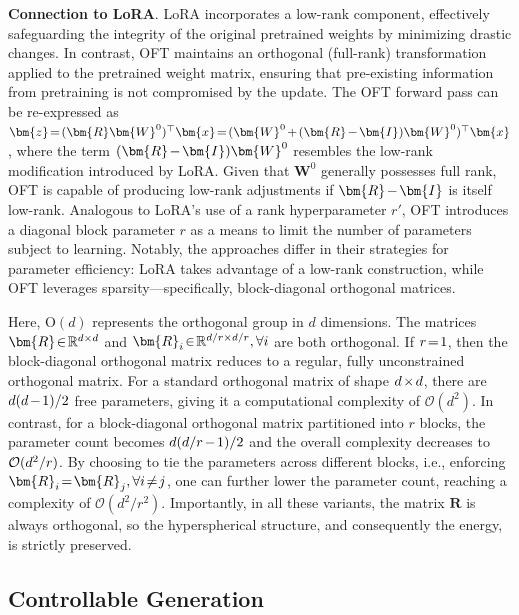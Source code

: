 \textbf{Connection to LoRA}. LoRA incorporates a low-rank component, effectively safeguarding the integrity of the original pretrained weights by minimizing drastic changes. In contrast, OFT maintains an orthogonal (full-rank) transformation applied to the pretrained weight matrix, ensuring that pre-existing information from pretraining is not compromised by the update. The OFT forward pass can be re-expressed as $\thickmuskip=2mu \medmuskip=2mu \bm{z}=(\bm{R}\bm{W}^0)^\top\bm{x}=(\bm{W}^0+(\bm{R}-\bm{I})\bm{W}^0)^\top\bm{x}$, where the term $\thickmuskip=2mu \medmuskip=2mu (\bm{R}-\bm{I})\bm{W}^0$ resembles the low-rank modification introduced by LoRA. Given that $\bm{W}^0$ generally possesses full rank, OFT is capable of producing low-rank adjustments if $\thickmuskip=2mu \medmuskip=2mu \bm{R}-\bm{I}$ is itself low-rank. Analogous to LoRA’s use of a rank hyperparameter $r'$, OFT introduces a diagonal block parameter $r$ as a means to limit the number of parameters subject to learning. Notably, the approaches differ in their strategies for parameter efficiency: LoRA takes advantage of a low-rank construction, while OFT leverages sparsity—specifically, block-diagonal orthogonal matrices.

Here, $\text{O}(d)$ represents the orthogonal group in $d$ dimensions. The matrices $\thickmuskip=2mu \medmuskip=2mu \bm{R}\in\mathbb{R}^{d\times d}$ and $\thickmuskip=2mu \medmuskip=2mu \bm{R}_i\in\mathbb{R}^{d/r\times d/r},\forall i$ are both orthogonal. If $\thickmuskip=2mu \medmuskip=2mu r=1$, then the block-diagonal orthogonal matrix reduces to a regular, fully unconstrained orthogonal matrix. For a standard orthogonal matrix of shape $\thickmuskip=2mu \medmuskip=2mu d\times d$, there are $\thickmuskip=2mu \medmuskip=2mu d(d-1)/2$ free parameters, giving it a computational complexity of $\mathcal{O}(d^2)$. In contrast, for a block-diagonal orthogonal matrix partitioned into $r$ blocks, the parameter count becomes $\thickmuskip=2mu \medmuskip=2mu d(d/r-1)/2$ and the overall complexity decreases to $\thickmuskip=2mu \medmuskip=2mu \mathcal{O}(d^2/r)$. By choosing to tie the parameters across different blocks, i.e., enforcing $\thickmuskip=2mu \medmuskip=2mu\bm{R}_i=\bm{R}_j,\forall i\neq j$, one can further lower the parameter count, reaching a complexity of $\mathcal{O}(d^2/r^2)$. Importantly, in all these variants, the matrix $\bm{R}$ is always orthogonal, so the hyperspherical structure, and consequently the energy, is strictly preserved.

\subsection{Controllable Generation}

